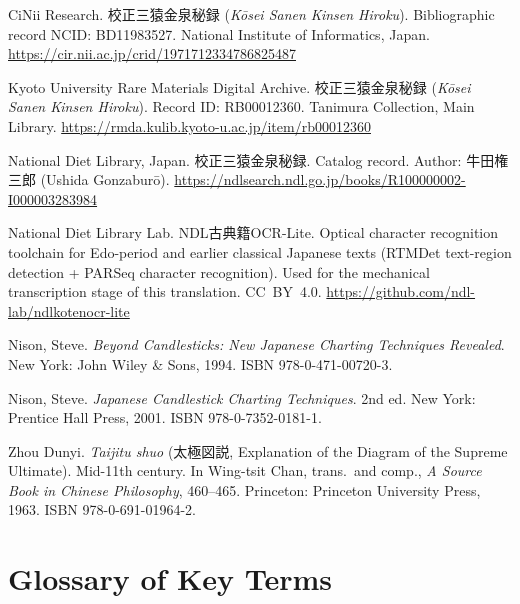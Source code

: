 \documentclass[10pt, openany]{book}
\newcommand{\jp}[1]{{\japanesefont #1}}
\begin{document}
\begin{description}[style=nextline, leftmargin=0em, font=\normalfont]

\item CiNii Research. \jp{校正三猿金泉秘録} (\textit{K\=osei Sanen Kinsen
  Hiroku}). Bibliographic record NCID: BD11983527. National Institute of
  Informatics, Japan.
  \url{https://cir.nii.ac.jp/crid/1971712334786825487}

\item Kyoto University Rare Materials Digital Archive. \jp{校正三猿金泉秘録}
  (\textit{K\=osei Sanen Kinsen Hiroku}). Record ID: RB00012360.
  Tanimura Collection, Main Library.
  \url{https://rmda.kulib.kyoto-u.ac.jp/item/rb00012360}

\item National Diet Library, Japan. \jp{校正三猿金泉秘録}. Catalog record.
  Author: \jp{牛田権三郎} (Ushida Gonzabur\=o).
  \url{https://ndlsearch.ndl.go.jp/books/R100000002-I000003283984}

\item National Diet Library Lab. NDL\jp{古典籍}OCR-Lite. Optical character
  recognition toolchain for Edo-period and earlier classical Japanese texts
  (RTMDet text-region detection + PARSeq character recognition). Used for
  the mechanical transcription stage of this translation. CC~BY~4.0.
  \url{https://github.com/ndl-lab/ndlkotenocr-lite}

\item Nison, Steve. \textit{Beyond Candlesticks: New Japanese Charting
  Techniques Revealed}. New York: John Wiley \& Sons, 1994.
  ISBN 978-0-471-00720-3.

\item Nison, Steve. \textit{Japanese Candlestick Charting Techniques}.
  2nd ed. New York: Prentice Hall Press, 2001.
  ISBN 978-0-7352-0181-1.

\item Zhou Dunyi. \textit{Taijitu shuo} (\jp{太極図説}, Explanation of the
  Diagram of the Supreme Ultimate). Mid-11th century. In Wing-tsit Chan,
  trans.\ and comp., \textit{A Source Book in Chinese Philosophy}, 460--465.
  Princeton: Princeton University Press, 1963.
  ISBN 978-0-691-01964-2.

\end{description}

\chapter*{Glossary of Key Terms}
\end{document}
